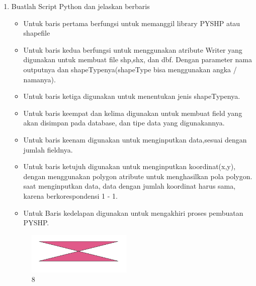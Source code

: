 \begin{enumerate}
	\item Buatlah Script Python dan jelaskan berbaris
	
	\begin{itemize}
		\item Untuk baris pertama berfungsi untuk memanggil library PYSHP atau shapefile
		\item Untuk baris kedua berfungsi untuk menggunakan atribute Writer yang digunakan untuk membuat file shp,shx, dan dbf. \hfill\break Dengan parameter nama outputnya dan shapeTypenya(shapeType bisa menggunakan angka / namanya).
		\item Untuk baris ketiga digunakan untuk menentukan jenis shapeTypenya.
		\item Untuk baris keempat dan kelima digunakan untuk membuat field yang akan disimpan pada database, dan tipe data yang digunakannya.
		\item Untuk baris keenam digunakan untuk menginputkan data,sesuai dengan jumlah fieldnya.
		\item Untuk baris ketujuh digunakan untuk menginputkan koordinat(x,y), dengan menggunakan polygon atribute untuk menghasilkan pola polygon. \hfill\break
		saat menginputkan data, data dengan jumlah koordinat harus sama, karena berkorespondensi 1 - 1.
		\item Untuk Baris kedelapan digunakan untuk mengakhiri proses pembuatan PYSHP.
	\end{itemize}
	\hfill\break
	\begin{figure}[H]
		\includegraphics[width=5cm]{figures/1174009/2/8.png}
		\centering
		\caption{8}
	\end{figure}


\end{enumerate}
